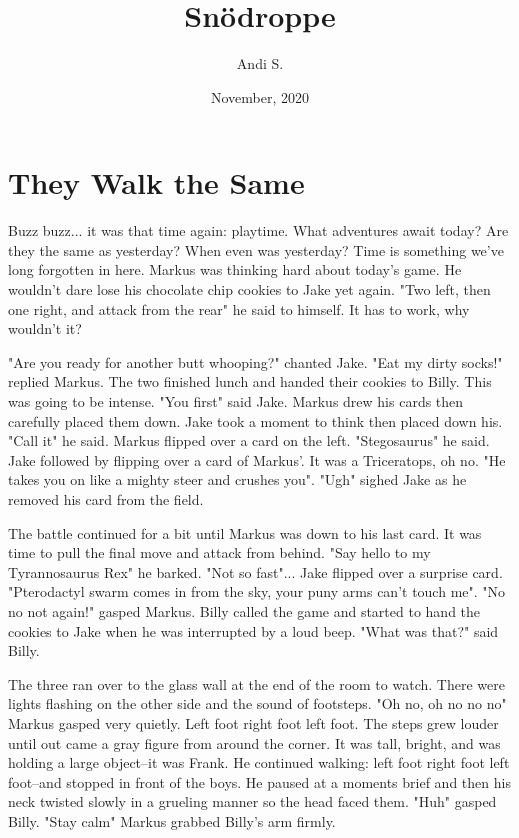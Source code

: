 \documentclass[12pt]{book}
\begin{document}
\title{Snödroppe}
\author{Andi S.}
\date{November, 2020}
\maketitle

\chapter{They Walk the Same}

Buzz buzz... it was that time again: playtime. What adventures await today? Are they the same as yesterday? When even was yesterday? Time is something we've long forgotten in here. Markus was thinking hard about today's game. He wouldn't dare lose his chocolate chip cookies to Jake yet again. "Two left, then one right, and attack from the rear" he said to himself. It has to work, why wouldn't it?

"Are you ready for another butt whooping?" chanted Jake. "Eat my dirty socks!" replied Markus. The two finished lunch and handed their cookies to Billy. This was going to be intense. "You first" said Jake. Markus drew his cards then carefully placed them down. Jake took a moment to think then placed down his. "Call it" he said. Markus flipped over a card on the left. "Stegosaurus" he said. Jake followed by flipping over a card of Markus'. It was a Triceratops, oh no. "He takes you on like a mighty steer and crushes you". "Ugh" sighed Jake as he removed his card from the field.

The battle continued for a bit until Markus was down to his last card. It was time to pull the final move and attack from behind. "Say hello to my Tyrannosaurus Rex" he barked. "Not so fast"... Jake flipped over a surprise card. "Pterodactyl swarm comes in from the sky, your puny arms can't touch me". "No no not again!" gasped Markus. Billy called the game and started to hand the cookies to Jake when he was interrupted by a loud beep. "What was that?" said Billy.

The three ran over to the glass wall at the end of the room to watch. There were lights flashing on the other side and the sound of footsteps. "Oh no, oh no no no" Markus gasped very quietly. Left foot right foot left foot. The steps grew louder until out came a gray figure from around the corner. It was tall, bright, and was holding a large object--it was Frank. He continued walking: left foot right foot left foot--and stopped in front of the boys. He paused at a moments brief and then his neck twisted slowly in a grueling manner so the head faced them. "Huh" gasped Billy. "Stay calm" Markus grabbed Billy's arm firmly.
\end{document}
